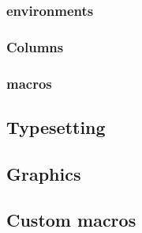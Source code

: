         \subsubsection*{\thesubsubsection\hspace{1em}\Glspl{environment}}
        \label{sec:tutorial/latex/table/env}
        
        
        \subsubsection{Columns}
        \label{sec:tutorial/latex/table/column}
        
        
        \subsubsection*{\thesubsubsection\hspace{1em}\Glspl{macro}}
        \label{sec:tutorial/latex/table/cmds}
        
        
    \subsection{Typesetting}
    \label{sec:tutorial/latex/listing}
    
    
    \subsection{Graphics}
    \label{sec:tutorial/latex/graphics}
    

    \subsection*{\thesubsection\hspace{1em}Custom \glspl{macro}}
    \label{sec:tutorial/latex/custom}
    
        
